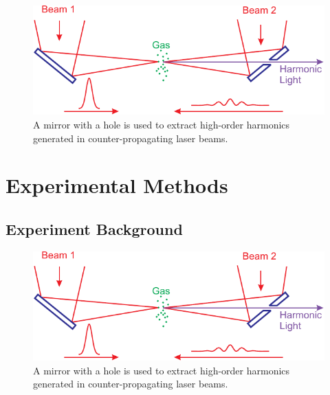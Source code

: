 \documentclass[oneside, astronomy, noacknowlegments]{BYUPhys}
\begin{document}
\begin{figure}
    \centerline{\includegraphics{Graphic1}}
    \caption[Example of spin-hamiltonion fields]{\label{fig:HamFields}
     A mirror with a hole is used to extract high-order harmonics generated in
     counter-propagating laser beams.}
 \end{figure}

\section{}
\section{}

\chapter{Experimental Methods}
\section{}
\section{}
\section{Experiment Background}

\begin{figure}
    \centerline{\includegraphics{Graphic1}}
    \caption[SiC energy levels and zero-field splitting]{\label{fig:SiCZeeman}
     A mirror with a hole is used to extract high-order harmonics generated in
     counter-propagating laser beams.}
 \end{figure}
\end{document}
